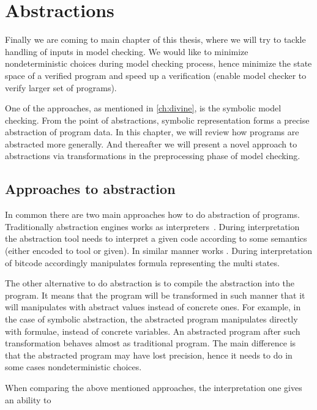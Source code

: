 \chapter{Abstractions}\label{ch:abstraction}

Finally we are coming to main chapter of this thesis, where we will try to tackle
handling of inputs in model checking. We would like to minimize nondeterministic
choices during model checking process, hence minimize the state space of a
verified program and speed up a verification (enable model checker to verify
larger set of programs).

One of the approaches, as mentioned in \autoref{ch:divine}, is the symbolic model checking.
From the point of abstractions, symbolic representation forms a precise abstraction
of program data. In this chapter, we will review how programs are abstracted more generally.
And thereafter we will present a novel approach to abstractions via transformations
in the preprocessing phase of model checking.

\section{Approaches to abstraction}

In common there are two main approaches how to do abstraction of programs.
Traditionally abstraction engines works as interpreters~\cite{Cousot79}. During
interpretation the abstraction tool needs to interpret a given code according
to some semantics (either encoded to tool or given). In similar manner works
\SymDIVINE.  During interpretation of \LLVM bitcode \SymDIVINE accordingly
manipulates formula representing the multi states.

The other alternative to do abstraction is to compile the abstraction into the
program. It means that the program will be transformed in such manner that it will
manipulates with abstract values instead of concrete ones. For example, in the
case of symbolic abstraction, the abstracted program manipulates directly with
formulae, instead of concrete variables. An abstracted program after such
transformation behaves almost as traditional program. The main difference is
that the abstracted program may have lost precision, hence it needs to do
in some cases nondeterministic choices.

When comparing the above mentioned approaches, the interpretation one gives an
ability to


